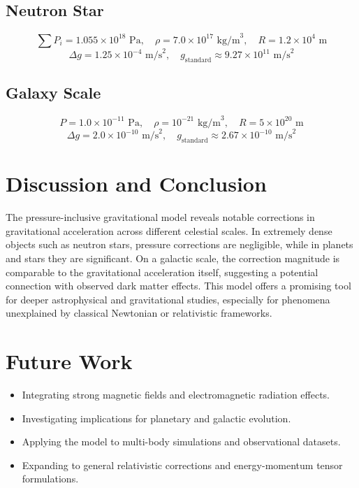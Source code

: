 \documentclass[12pt,a4paper]{article}
\begin{document}
\subsection{Neutron Star}
\[ \sum P_i = 1.055 \times 10^{18} \text{ Pa}, \quad \rho = 7.0 \times 10^{17} \text{ kg/m}^3, \quad R = 1.2 \times 10^{4} \text{ m} \]
\[ \Delta g = 1.25 \times 10^{-4} \text{ m/s}^2, \quad g_{\text{standard}} \approx 9.27 \times 10^{11} \text{ m/s}^2 \]

\subsection{Galaxy Scale}
\[ P = 1.0 \times 10^{-11} \text{ Pa}, \quad \rho = 10^{-21} \text{ kg/m}^3, \quad R = 5 \times 10^{20} \text{ m} \]
\[ \Delta g = 2.0 \times 10^{-10} \text{ m/s}^2, \quad g_{\text{standard}} \approx 2.67 \times 10^{-10} \text{ m/s}^2 \]

\section{Discussion and Conclusion}
The pressure-inclusive gravitational model reveals notable corrections in gravitational acceleration across different celestial scales. In extremely dense objects such as neutron stars, pressure corrections are negligible, while in planets and stars they are significant. On a galactic scale, the correction magnitude is comparable to the gravitational acceleration itself, suggesting a potential connection with observed dark matter effects. This model offers a promising tool for deeper astrophysical and gravitational studies, especially for phenomena unexplained by classical Newtonian or relativistic frameworks.

\section{Future Work}
\begin{itemize}
\item Integrating strong magnetic fields and electromagnetic radiation effects.
\item Investigating implications for planetary and galactic evolution.
\item Applying the model to multi-body simulations and observational datasets.
\item Expanding to general relativistic corrections and energy-momentum tensor formulations.
\end{itemize}
\end{document}
